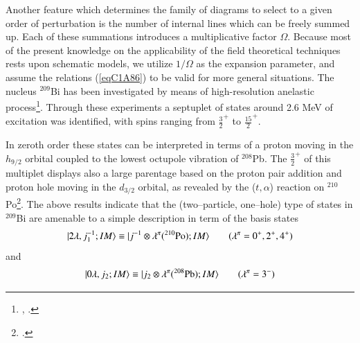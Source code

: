 Another feature which determines the family of diagrams to select to a given order of perturbation is the number of internal lines which can be freely summed up. Each of these summations introduces a multiplicative factor $\Omega$. 
Because most of the present knowledge on the applicability of the field theoretical techniques rests upon schematic models, we utilize $1/\Omega$ as the expansion parameter, and assume the relations (\ref{eqC1A86}) to be valid for more general situations. 
The nucleus $^{209}$Bi has been investigated by means of high-resolution anelastic process\footnote{\cite{Ungrin:71}, \cite{Broglia:70}.}. Through these experiments a septuplet of states around 2.6 MeV of excitation was identified, with spins 
ranging from $\frac{3}{2}^+$ to $\frac{15}{2}^+$. 


In zeroth order these states can be interpreted in terms of a proton moving in the $h_{9/2}$ orbital coupled to the lowest octupole vibration of $^{208}$Pb. The $\frac{3}{2}^+$ of this multiplet displays also a large parentage based on the proton pair addition 
and proton hole moving in the $d_{3/2}$ orbital, as revealed by the ($t,\alpha$) reaction 
on $^{210}$Po\footnote{\cite{Barnes:72}.}. 
The above results indicate that the (two--particle, one--hole) type of states 
in $^{209}$Bi are amenable to a simple description in term of the basis states 
  \begin{align}\label{eqC1A87} 
   |{2\lambda,j^{-1}_1;IM} \rangle\equiv |{j^{-1}\otimes \lambda^\pi(^{210}\text{Po});IM} \rangle\qquad(\lambda^{\pi}=0^+,2^+,4^+)
    \end{align} 
and 
  \begin{align}\label{eqC1A88} 
   |{0\lambda,j_2;IM} \rangle\equiv |{j_2\otimes \lambda^\pi(^{208}\text{Pb});IM} \rangle\qquad(\lambda^{\pi}=3^-)
    \end{align} 
